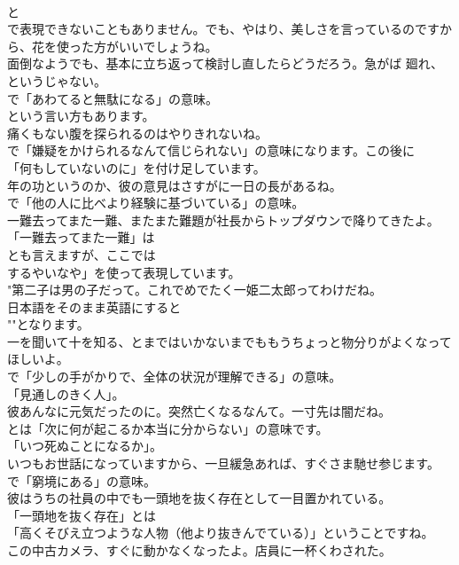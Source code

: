 \documentclass[8pt]{extreport}
\begin{document}
\begin{CJK}{UTF8}{min}
\\	と
\\	で表現できないこともありません。でも、やはり、美しさを言っているのですから、花を使った方がいいでしょうね。	
\\	面倒なようでも、基本に立ち返って検討し直したらどうだろう。急がば 廻れ、というじゃない。 
\\	で「あわてると無駄になる」の意味。
\\	という言い方もあります。	
\\	痛くもない腹を探られるのはやりきれないね。 
\\	で「嫌疑をかけられるなんて信じられない」の意味になります。この後に
\\	「何もしていないのに」を付け足しています。	
\\	年の功というのか、彼の意見はさすがに一日の長があるね。 
\\	で「他の人に比べより経験に基づいている」の意味。	
\\	一難去ってまた一難、またまた難題が社長からトップダウンで降りてきたよ。 
\\	「一難去ってまた一難」は
\\	とも言えますが、ここでは
\\	するやいなや」を使って表現しています。	
\\	"第二子は男の子だって。これでめでたく一姫二太郎ってわけだね。 
\\	日本語をそのまま英語にすると
\\	""となります。
\\	一を聞いて十を知る、とまではいかないまでももうちょっと物分りがよくなってほしいよ。 
\\	で「少しの手がかりで、全体の状況が理解できる」の意味。
\\	「見通しのきく人」。	
\\	彼あんなに元気だったのに。突然亡くなるなんて。一寸先は闇だね。 
\\	とは「次に何が起こるか本当に分からない」の意味です。
\\	「いつ死ぬことになるか」。	
\\	いつもお世話になっていますから、一旦緩急あれば、すぐさま馳せ参じます。 
\\	で「窮境にある」の意味。	
\\	彼はうちの社員の中でも一頭地を抜く存在として一目置かれている。 
\\	「一頭地を抜く存在」とは
\\	「高くそびえ立つような人物（他より抜きんでている）」ということですね。	
\\	この中古カメラ、すぐに動かなくなったよ。店員に一杯くわされた。 

\end{CJK}
\end{document}
